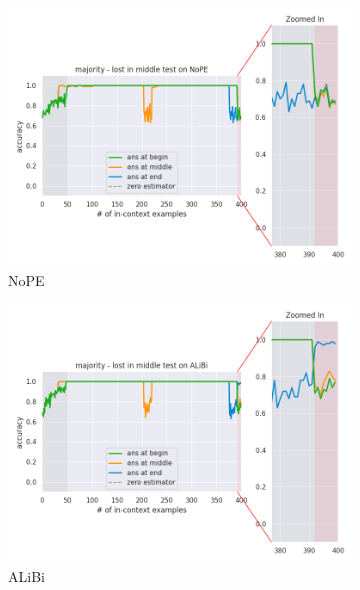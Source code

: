 \documentclass[letterpaper]{article} %
\begin{document}
\begin{figure}[tp]
    \centering
    \begin{subfigure}[t]{0.48\linewidth}
        \includegraphics[width=\linewidth]{AnonymousSubmission/LaTeX/imgs/analysis/serial-majority/nope_lost.png}
        \caption{NoPE}
    \end{subfigure}
    \begin{subfigure}[t]{0.48\linewidth}
        \includegraphics[width=\linewidth]{AnonymousSubmission/LaTeX/imgs/analysis/serial-majority/alibi_lost.png}
        \caption{ALiBi}
    \end{subfigure}
    \\
    \begin{subfigure}[t]{0.48\linewidth}

\end{subfigure}
\end{figure}
\end{document}
